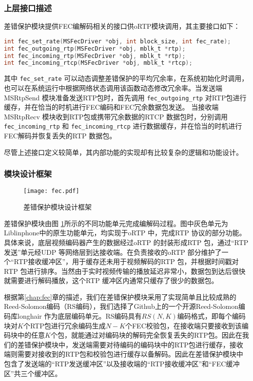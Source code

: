     \subsubsection{上层接口描述}
    差错保护模块提供FEC编解码相关的接口供oRTP模块调用，其主要接口如下：
    \begin{lstlisting}[language=C]
int fec_set_rate(MSFecDriver *obj, int block_size, int fec_rate);
int fec_outgoing_rtp(MSFecDriver *obj, mblk_t *rtp);
int fec_incoming_rtp(MSFecDriver *obj, mblk_t *rtp);
int fec_incoming_rtcp(MSFecDriver *obj, mblk_t *rtcp);
    \end{lstlisting}

    其中 \lstinline!fec_set_rate! 可以动态调整差错保护的平均冗余率，在系统初始化时调用，也可以在系统运行中根据网络状态调用该函数动态修改冗余率。当发送端 MSRtpSend 模块准备发送RTP包时，首先调用 \lstinline!fec_outgoing_rtp! 对RTP包进行缓存，并在恰当的时机进行FEC编码和FEC冗余数据包发送。 当接收端 MSRtpRecv 模块收到RTP包或携带冗余数据的RTCP 数据包时，分别调用 \lstinline!fec_incoming_rtp! 和 \lstinline!fec_incoming_rtcp! 进行数据缓存，并在恰当的时机进行FEC解码并恢复丢失的RTP 数据包。

    尽管上述接口定义较简单，其内部功能的实现却有比较复杂的逻辑和功能设计。

    \subsubsection{模块设计框架}
    \begin{figure}[htbp]
      \centering
      \texttt{[image: fec.pdf]}
      \caption{差错保护模块设计框架}
      \label{fig:fec_arch}
    \end{figure}

    差错保护模块由图 \ref{fig:fec_arch}所示的不同功能单元完成编解码过程。图中灰色单元为Liblinphone中的原生功能单元，均实现于oRTP 中，完成RTP 协议的部分功能。具体来说，底层视频编码器产生的数据经过oRTP 的封装形成RTP 包，通过``RTP发送''单元经UDP 等网络层到达接收端。在负责接收的oRTP 部分维护了一个``RTP接收缓冲区''，用于缓存还未用于视频解码的RTP 包，并根据时间戳对RTP 包进行排序。当然由于实时视频传输的播放延迟非常小，数据包到达后很快就需要进行解码播放，这个RTP 缓冲区内通常只缓存了很少的数据包。

    根据第\ref{chap:fec}章的描述，我们在差错保护模块采用了实现简单且比较成熟的Reed-Solomon编码（RS编码），我们选择了Github上的一个开源Reed-Solomon编码库longhair\cite{website:longhair} 作为底层编码单元。RS编码具有$RS(N,K)$编码格式，即每个编码块对$K$个RTP包进行冗余编码生成$N-K$个FEC校验包，在接收端只要接收到该编码块中的任意$K$个包，就能通过对编码块的解码完全恢复丢失的RTP包。因此在我们的差错保护模块中，发送端需要对待编码的编码块中的RTP包进行缓存，接收端则需要对接收到的RTP包和校验包进行缓存以备解码。因此在差错保护模块中包含了发送端的``RTP发送缓冲区''以及接收端的``RTP接收缓冲区''和``FEC缓冲区''共三个缓冲区。

